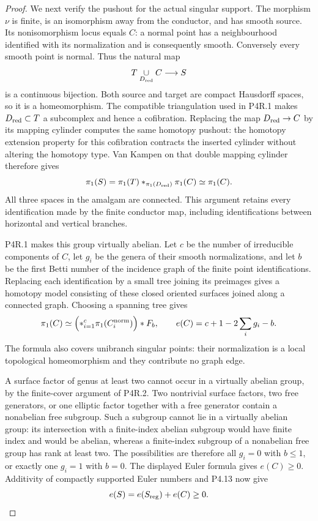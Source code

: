 \begin{proof}
We next verify the pushout for the actual singular
support. The morphism $\nu$ is finite, is an
isomorphism away from the conductor, and has smooth
source. Its nonisomorphism locus equals $C$: a normal
point has a neighbourhood identified with its
normalization and is consequently smooth. Conversely
every smooth point is normal. Thus the natural map
\[
 T\underset{D_{\rm red}}{\cup}C\longrightarrow S
\]
is a continuous bijection. Both source and target are
compact Hausdorff spaces, so it is a homeomorphism.
The compatible triangulation used in P4R.1 makes
$D_{\rm red}\subset T$ a subcomplex and hence a
cofibration. Replacing the map $D_{\rm red}\to C$ by
its mapping cylinder computes the same homotopy
pushout: the homotopy extension property for this
cofibration contracts the inserted cylinder without
altering the homotopy type. Van Kampen on that double
mapping cylinder therefore gives
\[
 \pi_1(S)=\pi_1(T)
       *_{\pi_1(D_{\rm red})}\pi_1(C)
       \simeq\pi_1(C).
\]
All three spaces in the amalgam are connected. This
argument retains every identification made by the
finite conductor map, including identifications
between horizontal and vertical branches.

P4R.1 makes this group virtually abelian. Let $c$ be
the number of irreducible components of $C$, let
$g_i$ be the genera of their smooth normalizations,
and let $b$ be the first Betti number of the incidence
graph of the finite point identifications. Replacing
each identification by a small tree joining its
preimages gives a homotopy model consisting of these
closed oriented surfaces joined along a connected
graph. Choosing a spanning tree gives
\[
 \pi_1(C)\simeq
   \Bigl(*_{i=1}^{c}\pi_1(C_i^{\rm norm})\Bigr)*F_b,
 \qquad
 e(C)=c+1-2\sum_i g_i-b.
\]
The formula also covers unibranch singular points:
their normalization is a local topological
homeomorphism and they contribute no graph edge.

A surface factor of genus at least two cannot occur
in a virtually abelian group, by the finite-cover
argument of P4R.2. Two nontrivial surface factors,
two free generators, or one elliptic factor together
with a free generator contain a nonabelian free
subgroup. Such a subgroup cannot lie in a virtually
abelian group: its intersection with a finite-index
abelian subgroup would have finite index and would
be abelian, whereas a finite-index subgroup of a
nonabelian free group has rank at least two. The
possibilities are therefore all $g_i=0$ with
$b\le1$, or exactly one $g_i=1$ with $b=0$.
The displayed Euler formula gives $e(C)\ge0$.
Additivity of compactly supported Euler numbers and
P4.13 now give
\[
 e(S)=e(S_{\rm reg})+e(C)\ge0.
\]


\end{proof}
